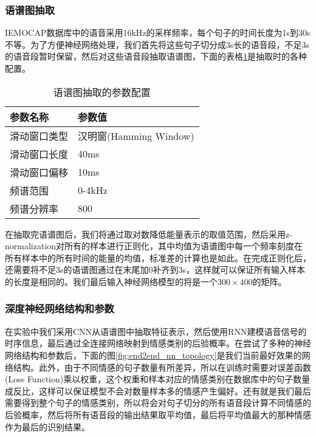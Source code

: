 \subsubsection{语谱图抽取}
\label{ssec:end2end_spectrogram_extract}

IEMOCAP数据库中的语音采用16kHz的采样频率，每个句子的时间长度为1s到30s不等。为了方便神经网络处理，我们首先将这些句子切分成3s长的语音段，不足3s的语音段暂时保留，然后对这些语音段抽取语谱图，下面的表格\ref{tab:end2end_spectrogram_setup}是抽取时的各种配置。

\begin{table}[htb]
\centering
\begin{minipage}[t]{0.8\linewidth} %
\caption{语谱图抽取的参数配置}
\label{tab:end2end_spectrogram_setup}
    \begin{tabularx}{\linewidth}{X<{\centering} X<{\centering}}
        \toprule[1.5pt]
        参数名称 & 参数值 \\
        \midrule[1pt]
        滑动窗口类型 & 汉明窗(Hamming Window) \\
        滑动窗口长度 & 40ms \\
        滑动窗口偏移 & 10ms \\
        频谱范围 & 0-4kHz \\
        频谱分辨率 & 800 \\
        \bottomrule[1.5pt]
    \end{tabularx}
\end{minipage}
\end{table}

在抽取完语谱图后，我们将通过取对数降低能量表示的取值范围，然后采用z-normalization对所有的样本进行正则化，其中均值为语谱图中每一个频率刻度在所有样本中的所有时间的能量的均值，标准差的计算也是如此。在完成正则化后，还需要将不足3s的语谱图通过在末尾加0补齐到3s，这样就可以保证所有输入样本的长度是相同的。我们最后输入神经网络模型的将是一个$300\times400$的矩阵。

\subsubsection{深度神经网络结构和参数}
\label{ssec:end2end_nn_topology}

在实验中我们采用CNN从语谱图中抽取特征表示，然后使用RNN建模语音信号的时序信息，最后通过全连接网络映射到情感类别的后验概率。在尝试了多种的神经网络结构和参数后，下面的图\ref{fig:end2end_nn_topology}是我们当前最好效果的网络结构。此外，由于不同情感的句子数量有所差异，所以在训练时需要对误差函数(Loss Function)乘以权重，这个权重和样本对应的情感类别在数据库中的句子数量成反比，这样可以保证模型不会对数量样本多的情感产生偏好。还有就是我们最后需要得到整个句子的情感类别，所以将会对句子切分的所有语音段计算不同情感的后验概率，然后将所有语音段的输出结果取平均值，最后将平均值最大的那种情感作为最后的识别结果。

